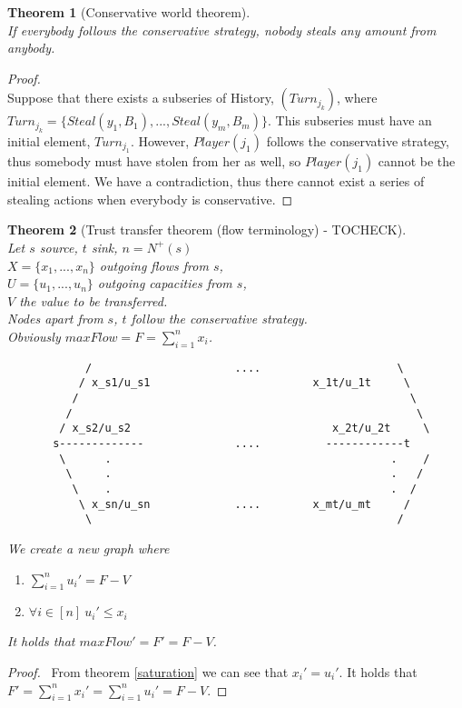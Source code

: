 \documentclass[11pt]{article}
\newtheorem{theorem}{Theorem}[section]
\theoremstyle{definition}
\theoremstyle{corollary}
\theoremstyle{lemma}
\begin{document}
    \begin{theorem}[Conservative world theorem] \ \\
    \label{conservativeworld}
       If everybody follows the conservative strategy, nobody steals any amount from anybody.
    \end{theorem}
    \begin{proof} \ \\
       Suppose that there exists a subseries of History, $(Turn_{j_k})$, where $Turn_{j_k} = \{Steal(y_1,B_1),...,
       Steal(y_m,B_m)\}$. This subseries must have an initial element, $Turn_{j_1}$. However, $Player(j_1)$ follows the conservative
       strategy, thus somebody must have stolen from her as well, so $Player(j_1)$ cannot be the initial element. We have a
       contradiction, thus there cannot exist a series of stealing actions when everybody is conservative.
    \end{proof}
    \begin{theorem}[Trust transfer theorem (flow terminology) - TOCHECK] \ \\
    \label{trusttransfer}
       Let $s$ source, $t$ sink, $n = N^{+}(s)$ \\
       $X = \{x_1, ..., x_n\}$ outgoing flows from $s$, \\
       $U = \{u_1, ..., u_n\}$ outgoing capacities from $s$, \\
       $V$ the value to be transferred. \\
       Nodes apart from $s$, $t$ follow the conservative strategy. \\
       Obviously $maxFlow = F = \sum\limits_{i=1}^{n}{x_i}$.
       {\em \begin{lstlisting}
            /                      ....                     \
           / x_s1/u_s1                         x_1t/u_1t     \
          /                                                   \
         /                                                     \
        / x_s2/u_s2                               x_2t/u_2t     \
       s-------------              ....          ------------t
        \      .                                           .    /
         \     .                                           .   /
          \    .                                           .  /
           \ x_sn/u_sn             ....        x_mt/u_mt     /
            \                                               /
       \end{lstlisting}}
       We create a new graph where
       \begin{enumerate}
         \item  $\sum\limits_{i=1}^{n}{u_i'} = F - V$
         \item $\forall i \in [n] \: u_i' \leq x_i$
       \end{enumerate}
 
       It holds that $maxFlow' = F' = F - V$.
    \end{theorem}
    \begin{proof} \
        From theorem \ref{saturation} we can see that $x_i' = u_i'$. It holds that $F' = \sum\limits_{i=1}^nx_i' =
        \sum\limits_{i=1}^nu_i' = F - V$.
    \end{proof}
\end{document}
